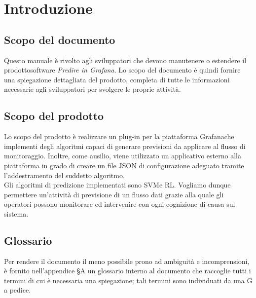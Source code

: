 \section{Introduzione}
\subsection{Scopo del documento}

Questo manuale è rivolto agli sviluppatori che devono manutenere o estendere il prodotto\glosp software \textit{Predire in Grafana}. Lo scopo del documento è quindi fornire una spiegazione dettagliata del prodotto\glo, completa di tutte le informazioni necessarie agli sviluppatori per svolgere le proprie attività.

\subsection{Scopo del prodotto}
Lo scopo del prodotto è realizzare un plug-in per la piattaforma Grafana\glosp che implementi degli algoritmi capaci di generare previsioni da applicare al flusso di monitoraggio. Inoltre, come ausilio, viene utilizzato un applicativo esterno alla piattaforma in grado di creare un file JSON di configurazione adeguato tramite l'addestramento del suddetto algoritmo. \\
Gli algoritmi di predizione implementati sono SVM\glosp e RL\glo.
Vogliamo dunque permettere un'attività di previsione di un flusso dati grazie alla quale gli operatori possono monitorare ed intervenire con ogni cognizione di causa sul sistema.

\subsection{Glossario}
Per rendere il documento il meno possibile prono ad ambiguità e incomprensioni, è fornito nell'appendice §A un glossario interno al documento che raccoglie tutti i termini di cui è necessaria una spiegazione; tali termini sono individuati da una G a pedice.

